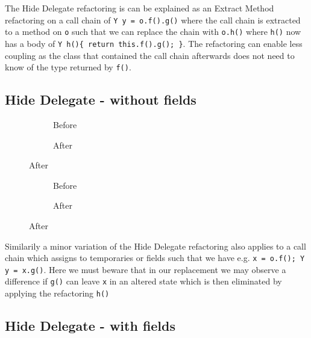 The Hide Delegate refactoring is can be explained as an Extract Method refactoring on a call chain of \lstinline[style=smallJava]|Y y = o.f().g()| where
the call chain is extracted to a method on \lstinline[style=smallJava]|o| such that we can replace the chain with \lstinline[style=smallJava]|o.h()|
where \lstinline[style=smallJava]|h()| now has a body of \lstinline[style=smallJava]|Y h(){ return this.f().g(); }|. The refactoring can enable less
coupling as the class that contained the call chain afterwards does not need to know of the type returned by \lstinline[style=smallJava]|f()|.

\subsection{Hide Delegate - without fields}

\begin{figure}
  \centering
  \begin{subfigure}{.4\linewidth}
    
    \caption{Before}
  \end{subfigure}\hspace{1cm}
  \begin{subfigure}{.4\linewidth}
    
    \caption{After}
  \end{subfigure}
\label{lst:HideDelegate-refinity}
\end{figure}

\begin{figure}
  \centering
  \begin{subfigure}{.4\linewidth}
    
    \caption{Before}
  \end{subfigure}\hspace{1cm}
  \begin{subfigure}{.4\linewidth}
    
    \caption{After}
  \end{subfigure}
\label{lst:HideDelegate-refinity}
\end{figure}

Similarily a minor variation of the  Hide Delegate refactoring also applies to a call chain which assigns to temporaries or fields such that
we have e.g. \lstinline[style=smallJava]|x = o.f(); Y y = x.g()|. Here we must beware that in our replacement we may observe a difference
if \lstinline[style=smallJava]|g()| can leave \lstinline[style=smallJava]|x| in an altered state which is then eliminated by applying
the refactoring \lstinline[style=smallJava]|h()|

\subsection{Hide Delegate - with fields}

